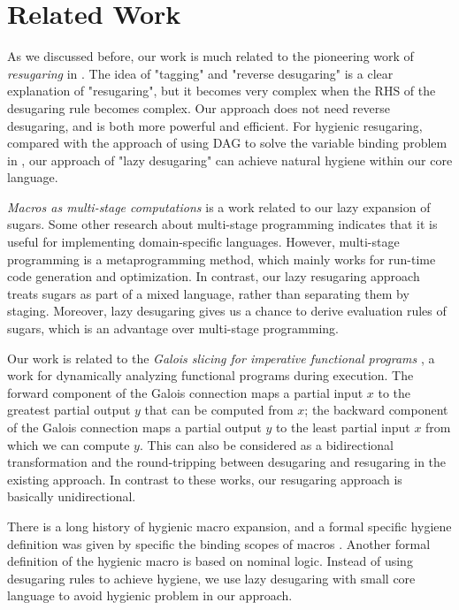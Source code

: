 \section{Related Work}
\label{sec6}

As we discussed before, our work is much related to the pioneering work of \emph{resugaring} in \cite{resugaring}. The idea of "tagging" and "reverse desugaring" is a clear explanation of "resugaring", but it becomes very complex when the RHS of the desugaring rule becomes complex. Our approach does not need reverse desugaring, and is both more powerful and efficient.
For hygienic resugaring, compared with the approach of using DAG to solve the variable binding  problem in \cite{hygienic}, our approach of "lazy desugaring" can achieve natural hygiene within our core language.



\emph{Macros as multi-stage computations} \cite{multistage} is a work related to our lazy expansion of sugars. Some other research \cite{modularstaging} about multi-stage programming \cite{MSP} indicates that it is useful for implementing domain-specific languages. However, multi-stage programming is a metaprogramming method, which mainly works for run-time code generation and optimization. In contrast, our lazy resugaring approach treats sugars as part of a mixed language, rather than separating them by staging. Moreover, lazy desugaring gives us a chance to derive evaluation rules of sugars, which is an advantage over multi-stage programming.

Our work is related to the \emph{Galois slicing for imperative functional programs} \cite{slicing}, a work for dynamically analyzing functional programs during execution. The forward component of the Galois connection maps a partial input $x$ to the greatest partial output $y$ that can be computed from $x$; the backward component of the Galois connection maps a partial output $y$ to the least partial input $x$ from which we can compute $y$.
This can also be considered as a bidirectional transformation \cite{bx,lens07} and the round-tripping between desugaring and resugaring in the existing approach. In contrast to these works, our resugaring approach is basically unidirectional. 


There is a long history of hygienic macro expansion\cite{hygienicmacro}, and a formal specific hygiene definition was given by specific the binding scopes of macros \cite{10.5555/1792878.1792884}. Another formal definition of the hygienic macro\cite{EssenceofHygiene} is based on nominal logic\cite{10.1007/s001650200016}. Instead of using desugaring rules to achieve hygiene, we use lazy desugaring with small core language to avoid hygienic problem in our approach.
%

